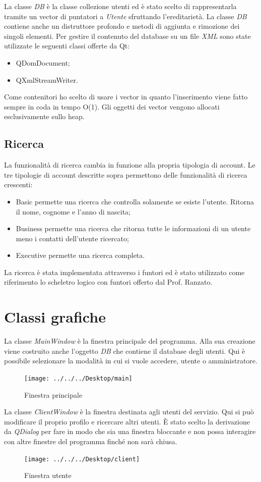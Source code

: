 \documentclass[11pt]{article}
\begin{document}
	La classe \textit{DB} è la classe collezione utenti ed è stato scelto di rappresentarla tramite un vector di puntatori a \textit{Utente} sfruttando l'ereditarietà. La classe \textit{DB} contiene anche un distruttore profondo e metodi di aggiunta e rimozione dei singoli elementi. Per gestire il contenuto del database su un file \textit{XML} sono state utilizzate le seguenti classi offerte da Qt:
	\begin{itemize}
		\item QDomDocument;
		\item QXmlStreamWriter.
	\end{itemize}
	Come contenitori ho scelto di usare i vector in quanto l'inserimento viene fatto sempre in coda in tempo O(1). Gli oggetti dei vector vengono allocati esclusivamente sullo heap.
	\subsection{Ricerca}
	La funzionalità di ricerca cambia in funzione alla propria tipologia di account. Le tre tipologie di account descritte sopra permettono delle funzionalità di ricerca crescenti:
	\begin{itemize}
		\item Basic permette una ricerca che controlla solamente se esiste l'utente. Ritorna il nome, cognome e l'anno di nascita;
		\item Business permette una ricerca che ritorna tutte le informazioni di un utente meno i contatti dell'utente ricercato;
		\item Executive permette una ricerca completa.
	\end{itemize}
	La ricerca è stata implementata attraverso i funtori ed è stato utilizzato come riferimento lo scheletro logico con funtori offerto dal Prof. Ranzato.
	\section{Classi grafiche}
	La classe \textit{MainWindow} è la finestra principale del programma. Alla sua creazione viene costruito anche l'oggetto \textit{DB} che contiene il database degli utenti. Qui è possibile selezionare la modalità in cui si vuole accedere, utente o amministratore.
	\begin{figure}[h]
\centering
\texttt{[image: ../../../Desktop/main]}
\caption[Finestra principale]{Finestra principale}
\label{fig:main}
	\end{figure}
	
	\newpage
	La classe \textit{ClientWindow} è la finestra destinata agli utenti del servizio. Qui si può modificare il proprio profilo e ricercare altri utenti. È stato scelto la derivazione da \textit{QDialog} per fare in modo che sia una finestra bloccante e non possa interagire con altre finestre del programma finché non sarà chiusa. 
	\begin{figure}[h]
\centering
\texttt{[image: ../../../Desktop/client]}
\caption[Finestra utente]{Finestra utente}
\label{fig:client}
\end{figure}
\end{document}
